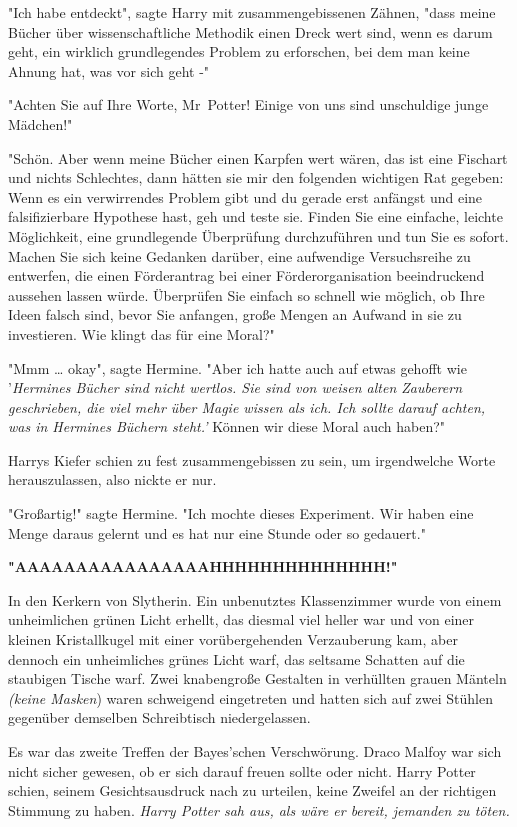 {"Ich habe entdeckt", sagte Harry mit zusammengebissenen Zähnen, "dass meine Bücher über wissenschaftliche Methodik einen Dreck wert sind, wenn es darum geht, ein wirklich grundlegendes Problem zu erforschen, bei dem man keine Ahnung hat, was vor sich geht -"

"Achten Sie auf Ihre Worte, Mr~Potter! Einige von uns sind unschuldige junge Mädchen!"

"Schön. Aber wenn meine Bücher einen Karpfen wert wären, das ist eine Fischart und nichts Schlechtes, dann hätten sie mir den folgenden wichtigen Rat gegeben: Wenn es ein verwirrendes Problem gibt und du gerade erst anfängst und eine falsifizierbare Hypothese hast, geh und teste sie. Finden Sie eine einfache, leichte Möglichkeit, eine grundlegende Überprüfung durchzuführen und tun Sie es sofort. Machen Sie sich keine Gedanken darüber, eine aufwendige Versuchsreihe zu entwerfen, die einen Förderantrag bei einer Förderorganisation beeindruckend aussehen lassen würde. Überprüfen Sie einfach so schnell wie möglich, ob Ihre Ideen falsch sind, bevor Sie anfangen, große Mengen an Aufwand in sie zu investieren. Wie klingt das für eine Moral?"

"Mmm … okay", sagte Hermine. "Aber ich hatte auch auf etwas gehofft wie '\emph{Hermines Bücher sind nicht wertlos. Sie sind von weisen alten Zauberern geschrieben, die viel mehr über Magie wissen als ich. Ich sollte darauf achten, was in Hermines Büchern steht.'} Können wir diese Moral auch haben?"

Harrys Kiefer schien zu fest zusammengebissen zu sein, um irgendwelche Worte herauszulassen, also nickte er nur.

"Großartig!" sagte Hermine. "Ich mochte dieses Experiment. Wir haben eine Menge daraus gelernt und es hat nur eine Stunde oder so gedauert."

\textbf{"AAAAAAAAAAAAAAAAHHHHHHHHHHHHHH!"}

In den Kerkern von Slytherin. Ein unbenutztes Klassenzimmer wurde von einem unheimlichen grünen Licht erhellt, das diesmal viel heller war und von einer kleinen Kristallkugel mit einer vorübergehenden Verzauberung kam, aber dennoch ein unheimliches grünes Licht warf, das seltsame Schatten auf die staubigen Tische warf. Zwei knabengroße Gestalten in verhüllten grauen Mänteln \emph{(keine Masken}) waren schweigend eingetreten und hatten sich auf zwei Stühlen gegenüber demselben Schreibtisch niedergelassen.

Es war das zweite Treffen der Bayes'schen Verschwörung. Draco Malfoy war sich nicht sicher gewesen, ob er sich darauf freuen sollte oder nicht. Harry Potter schien, seinem Gesichtsausdruck nach zu urteilen, keine Zweifel an der richtigen Stimmung zu haben. \emph{Harry Potter sah aus, als wäre er bereit, jemanden zu töten.}

}
